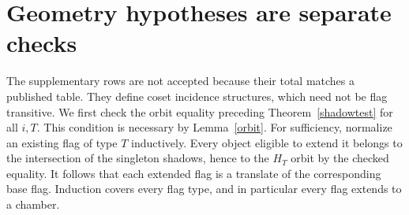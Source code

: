 \documentclass[11pt]{article}
\begin{document}
\section{Geometry hypotheses are separate checks}
The supplementary rows are not accepted because their total matches a
published table. They define coset incidence structures, which need not
be flag transitive. We first check the orbit equality preceding
Theorem~\ref{shadowtest} for all $i,T$. This condition is necessary by
Lemma~\ref{orbit}. For sufficiency, normalize an existing flag of type
$T$ inductively. Every object eligible to extend it belongs to the
intersection of the singleton shadows, hence to the $H_T$ orbit by the
checked equality. It follows that each extended flag is a translate of
the corresponding base flag. Induction covers every flag type, and
in particular every flag extends to a chamber.
\end{document}
